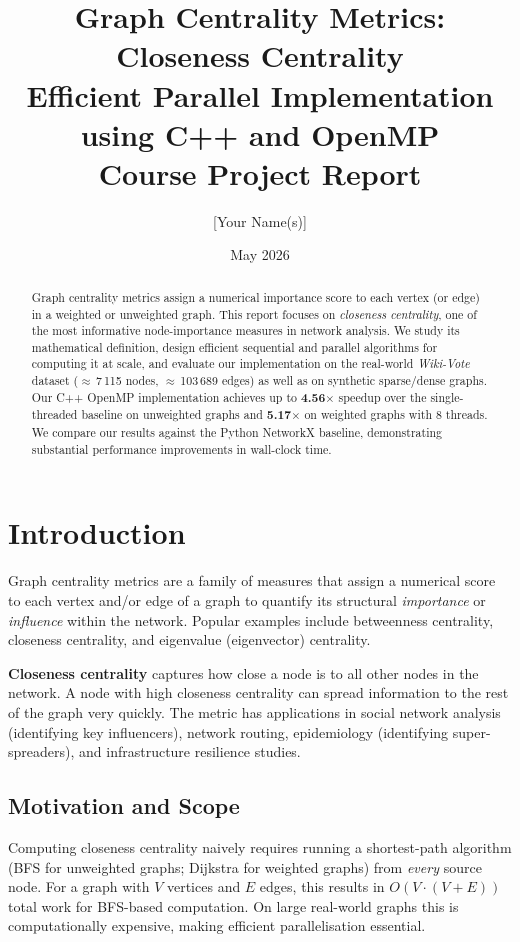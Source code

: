 \documentclass[12pt,a4paper]{article}
\title{
  \vspace{-1cm}
  \Large \textbf{Graph Centrality Metrics: Closeness Centrality}\\[0.5em]
  \large Efficient Parallel Implementation using C++ and OpenMP\\[0.5em]
  \normalsize Course Project Report
}
\author{[Your Name(s)]}
\date{May 2026}
\begin{document}
\maketitle
\thispagestyle{fancy}

\begin{abstract}
Graph centrality metrics assign a numerical importance score to each vertex (or edge)
in a weighted or unweighted graph.  This report focuses on \emph{closeness centrality},
one of the most informative node-importance measures in network analysis.  We study its
mathematical definition, design efficient sequential and parallel algorithms for computing
it at scale, and evaluate our implementation on the real-world \textit{Wiki-Vote} dataset
($\approx$\,7\,115 nodes, $\approx$\,103\,689 edges) as well as on synthetic sparse/dense
graphs.  Our C++ OpenMP implementation achieves up to \textbf{4.56$\times$} speedup over
the single-threaded baseline on unweighted graphs and \textbf{5.17$\times$} on weighted
graphs with 8 threads.  We compare our results against the Python NetworkX baseline,
demonstrating substantial performance improvements in wall-clock time.
\end{abstract}

\tableofcontents
\newpage

\section{Introduction}
\label{sec:intro}

Graph centrality metrics are a family of measures that assign a numerical score to each
vertex and/or edge of a graph to quantify its structural \emph{importance} or
\emph{influence} within the network.  Popular examples include betweenness centrality,
closeness centrality, and eigenvalue (eigenvector) centrality.

\textbf{Closeness centrality} captures how close a node is to all other nodes in the
network.  A node with high closeness centrality can spread information to the rest of the
graph very quickly.  The metric has applications in social network analysis (identifying
key influencers), network routing, epidemiology (identifying super-spreaders), and
infrastructure resilience studies.

\subsection{Motivation and Scope}
Computing closeness centrality naively requires running a shortest-path algorithm (BFS for
unweighted graphs; Dijkstra for weighted graphs) from \emph{every} source node.  For a
graph with $V$ vertices and $E$ edges, this results in $O(V \cdot (V + E))$ total work
for BFS-based computation.  On large real-world graphs this is computationally expensive,
making efficient parallelisation essential.
\end{document}
